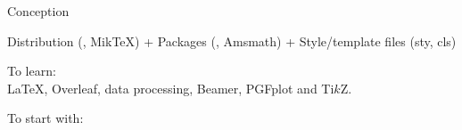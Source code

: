 \documentclass[xcolor=dvipsnames, aspectratio=169, handout, intlimits]{beamer}
\begin{document}
\begin{frame}{Conception}

\vspace{-0.5cm}
Distribution (\eg{}, MikTeX) + Packages (\eg{}, Amsmath) + Style/template files (sty, cls)

\vspace{0.5cm}
To learn: \\
\LaTeX, Overleaf, data processing, Beamer, PGFplot and Ti$k$Z.

\vspace{0.25cm}
To start with:
\begin{columns}
	\begin{column}{0.33\textwidth}	
		\centering
		\href{https://en.wikibooks.org/wiki/LaTeX/Basics}{}		
	\end{column}
	\begin{column}{0.33\textwidth}	
		\centering		
		\href{https://www.overleaf.com/learn/latex/Learn_LaTeX_in_30_minutes}{}	
	\end{column}
	\begin{column}{0.33\textwidth}
		\centering		
		\href{https://www.latex4technics.com/}{}	
	\end{column}		
\end{columns}

\end{frame}
\end{document}
